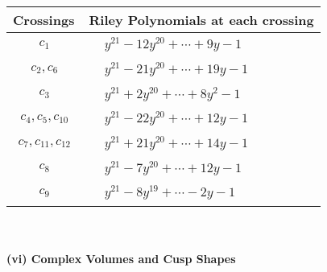 \documentclass[1p]{elsarticle_modified}
\theoremstyle{definition}
\begin{document}
\begin{tabular}{m{50pt}|m{274pt}}
Crossings & \hspace{64pt}Riley Polynomials at each crossing \\
\hline $$\begin{aligned}c_{1}\end{aligned}$$&$\begin{aligned}
&y^{21}-12 y^{20}+\cdots+9 y-1
\end{aligned}$\\
\hline $$\begin{aligned}c_{2},c_{6}\end{aligned}$$&$\begin{aligned}
&y^{21}-21 y^{20}+\cdots+19 y-1
\end{aligned}$\\
\hline $$\begin{aligned}c_{3}\end{aligned}$$&$\begin{aligned}
&y^{21}+2 y^{20}+\cdots+8 y^2-1
\end{aligned}$\\
\hline $$\begin{aligned}c_{4},c_{5},c_{10}\end{aligned}$$&$\begin{aligned}
&y^{21}-22 y^{20}+\cdots+12 y-1
\end{aligned}$\\
\hline $$\begin{aligned}c_{7},c_{11},c_{12}\end{aligned}$$&$\begin{aligned}
&y^{21}+21 y^{20}+\cdots+14 y-1
\end{aligned}$\\
\hline $$\begin{aligned}c_{8}\end{aligned}$$&$\begin{aligned}
&y^{21}-7 y^{20}+\cdots+12 y-1
\end{aligned}$\\
\hline $$\begin{aligned}c_{9}\end{aligned}$$&$\begin{aligned}
&y^{21}-8 y^{19}+\cdots-2 y-1
\end{aligned}$\\
\hline
\end{tabular}\\~\\
\newpage\flushleft \textbf{(vi) Complex Volumes and Cusp Shapes}
\end{document}
